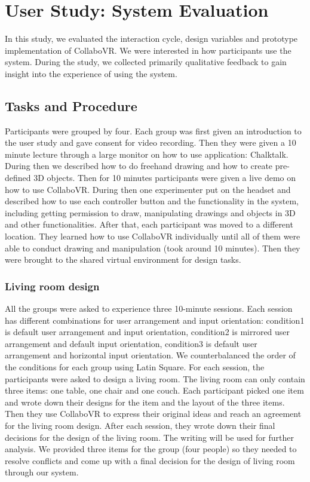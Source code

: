 \documentclass{sigchi}
\begin{document}
\section{User Study: System Evaluation}

In this study, we evaluated the interaction cycle, design variables and prototype implementation of CollaboVR. We were interested in how participants use the system. During the study, we collected primarily qualitative feedback to gain insight into the experience of using the system.

\subsection{Tasks and Procedure}
Participants were grouped by four. Each group was first given an introduction to the user study and gave consent for video recording. Then they were given a 10 minute lecture through a large monitor on how to use application: Chalktalk. During then we described how to do freehand drawing and how to create pre-defined 3D objects.
Then for 10 minutes participants were given a live demo on how to use CollaboVR. During then one experimenter put on the headset and described how to use each controller button and the functionality in the system, including getting permission to draw, manipulating drawings and objects in 3D and other functionalities.
After that, each participant was moved to a different location. They learned how to use CollaboVR individually until all of them were able to conduct drawing and manipulation (took around 10 minutes). Then they were brought to the shared virtual environment for design tasks. 

\subsubsection{Living room design}
All the groups were asked to experience three 10-minute sessions. 
Each session has different combinations for user arrangement and input orientation: condition1 is default user arrangement and input orientation, condition2 is mirrored user arrangement and default input orientation, condition3 is default user arrangement and horizontal input orientation.
We counterbalanced the order of the conditions for each group using Latin Square. For each session, the participants were asked to design a living room. The living room can only contain three items: one table, one chair and one couch. 
Each participant picked one item and wrote down their designs for the item and the layout of the three items. Then they use CollaboVR to express their original ideas and reach an agreement for the living room design. After each session, they wrote down their final decisions for the design of the living room. The writing will be used for further analysis.
We provided three items for the group (four people) so they needed to resolve conflicts and come up with a final decision for the design of living room through our system.
\end{document}
